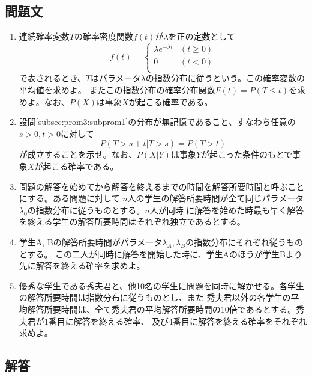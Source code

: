 \subsection{問題文}
\begin{enumerate}[(1)]
    \item 連続確率変数$T$の確率密度関数$f(t)$が$\lambda$を正の定数として
        \begin{equation*}
            f(t) = 
            \begin{cases}
                \lambda e^{-\lambda t} & (t\geq 0)\\    
                0 & (t < 0)\\    
            \end{cases}
        \end{equation*}
        で表されるとき、$T$はパラメータ$\lambda$の指数分布に従うという。この確率変数の平均値を求めよ。
        またこの指数分布の確率分布関数$F(t) = P (T\leq t)$を求めよ。なお、$P(X)$は事象$X$が起こる確率である。\label{subsec:prom3:subprom1}
    \item 設問\eqref{subsec:prom3:subprom1}の分布が無記憶であること、すなわち任意の$s > 0, t > 0$に対して
        \begin{equation*}
            P(T > s + t | T > s) = P(T > t)
        \end{equation*}
        が成立することを示せ。なお、$P(X|Y)$は事象$Y$が起こった条件のもとで事象$X$が起こる確率である。\label{subsec:prom3:subprom2}
    \item 問題の解答を始めてから解答を終えるまでの時間を解答所要時間と呼ぶことにする。ある問題に対して
        $n$人の学生の解答所要時間が全て同じパラメータ$\lambda_0$の指数分布に従うものとする。$n$人が同時
        に解答を始めた時最も早く解答を終える学生の解答所要時間はそれぞれ独立であるとする。\label{subsec:prom3:subprom3}
    \item 学生A, Bの解答所要時間がパラメータ$\lambda_A, \lambda_B$の指数分布にそれぞれ従うものとする。
        この二人が同時に解答を開始した時に、学生Aのほうが学生Bより先に解答を終える確率を求めよ。\label{subsec:prom3:subprom4}
    \item 優秀な学生である秀夫君と、他10名の学生に問題を同時に解かせる。各学生の解答所要時間は指数分布に従うものとし、また
    秀夫君以外の各学生の平均解答所要時間は、全て秀夫君の平均解答所要時間の10倍であるとする。秀夫君が1番目に解答を終える確率、
    及び4番目に解答を終える確率をそれぞれ求めよ。\label{subsec:prom3:subprom5}
\end{enumerate}
\newpage
\subsection{解答}